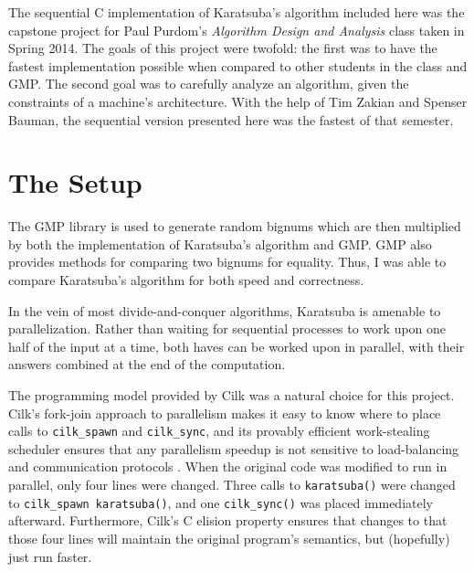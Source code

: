 \documentclass[8pt, twocolumn]{article}
\begin{document}
The sequential C implementation of Karatsuba's algorithm included here was the
capstone project for Paul Purdom's \textit{Algorithm Design and Analysis} class
taken in Spring 2014.  The goals of this project were twofold: the first was to
have the fastest implementation possible when compared to other students in the
class and GMP.  The second goal was to carefully analyze an algorithm, given the
constraints of a machine's architecture.  With the help of Tim Zakian and
Spenser Bauman, the sequential version presented here was the fastest of that
semester.

\section{The Setup}
The GMP library is used to generate random bignums which are then multiplied by
both the implementation of Karatsuba's algorithm and GMP. GMP also provides
methods for comparing two bignums for equality. Thus, I was able to compare
Karatsuba's algorithm for both speed and correctness.

In the vein of most divide-and-conquer algorithms, Karatsuba is amenable to
parallelization.  Rather than waiting for sequential processes to work upon one
half of the input at a time, both haves can be worked upon in parallel, with
their answers combined at the end of the computation.

The programming model provided by Cilk was a natural choice for this project.
Cilk's fork-join approach to parallelism makes it easy to know where to place
calls to \texttt{cilk\_spawn} and \texttt{cilk\_sync}, and its provably
efficient work-stealing scheduler ensures that any parallelism speedup is not
sensitive to load-balancing and communication protocols \cite{leiserson}.  When
the original code was modified to run in parallel, only four lines were changed.
Three calls to \texttt{karatsuba()} were changed to \texttt{cilk\_spawn
karatsuba()}, and one \texttt{cilk\_sync()} was placed immediately afterward.
Furthermore, Cilk's C elision property ensures that changes to that those four
lines will maintain the original program's semantics, but (hopefully) just run
faster.
\end{document}
